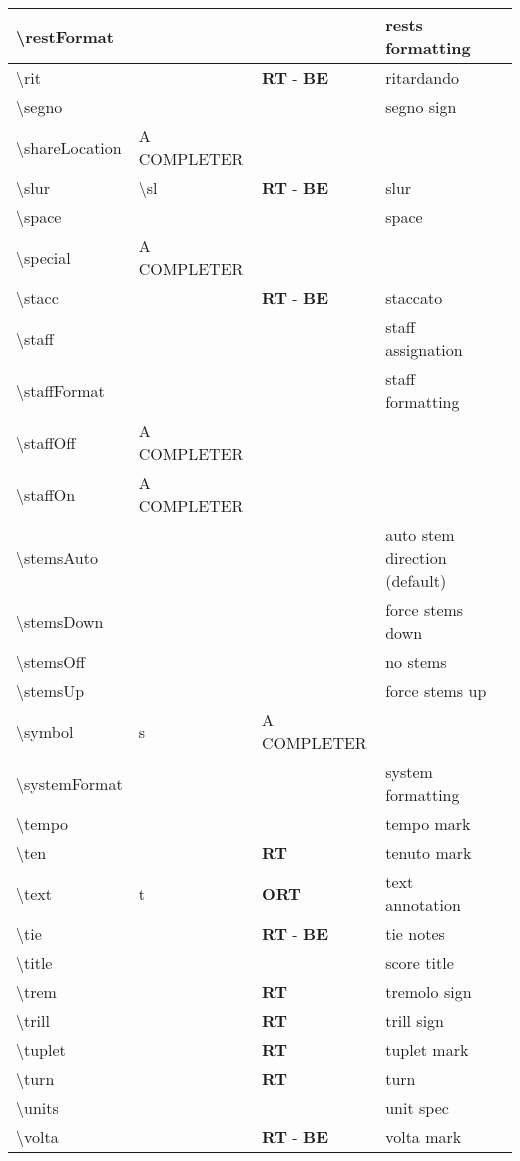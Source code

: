 \documentclass[11pt]{article}
\begin{document}
\begin{tabular}{lllll}
    \hline
    \textbackslash{}restFormat&&&rests formatting&\\
    \hline
    \textbackslash{}rit&&\textbf{RT} - \textbf{BE}&ritardando&\\
    \hline
    \textbackslash{}segno&&&segno sign&\\
    \hline
    \textbackslash{}shareLocation&A COMPLETER&&&\\
    \hline
    \textbackslash{}slur&\textbackslash{}sl&\textbf{RT} - \textbf{BE}&slur&\\
    \hline
    \textbackslash{}space&&&space&\\
    \hline
    \textbackslash{}special&A COMPLETER&&&\\
    \hline
    \textbackslash{}stacc&&\textbf{RT} - \textbf{BE}&staccato&\\
    \hline
    \textbackslash{}staff&&&staff assignation&\\
    \hline
    \textbackslash{}staffFormat&&&staff formatting&\\
    \hline
    \textbackslash{}staffOff&A COMPLETER&&&\\
    \hline
    \textbackslash{}staffOn&A COMPLETER&&&\\
    \hline
    \textbackslash{}stemsAuto&&&auto stem direction (default)&\\
    \hline
    \textbackslash{}stemsDown&&&force stems down&\\
    \hline
    \textbackslash{}stemsOff&&&no stems&\\
    \hline
    \textbackslash{}stemsUp&&&force stems up&\\
    \hline
    \textbackslash{}symbol&s&A COMPLETER&&\\
    \hline
    \textbackslash{}systemFormat&&&system formatting&\\
    \hline
    \textbackslash{}tempo&&&tempo mark&\\
    \hline
    \textbackslash{}ten&&\textbf{RT}&tenuto mark&\\
    \hline
    \textbackslash{}text&t&\textbf{ORT}&text annotation&\\
    \hline
    \textbackslash{}tie&&\textbf{RT} - \textbf{BE}&tie notes&\\
    \hline
    \textbackslash{}title&&&score title&\\
    \hline
    \textbackslash{}trem&&\textbf{RT}&tremolo sign&\\
    \hline
    \textbackslash{}trill&&\textbf{RT}&trill sign&\\
    \hline
    \textbackslash{}tuplet&&\textbf{RT}&tuplet mark&\\
    \hline
    \textbackslash{}turn&&\textbf{RT}&turn&\\
    \hline
    \textbackslash{}units&&&unit spec&\\
    \hline
    \textbackslash{}volta&&\textbf{RT} - \textbf{BE}&volta mark&\\
    \hline
\end{tabular}
 
\end{document}
